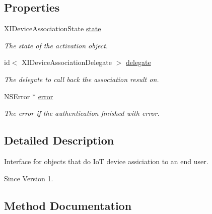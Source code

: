 \subsection*{Properties}
\begin{DoxyCompactItemize}
\item 
X\+I\+Device\+Association\+State \hyperlink{protocol_x_i_device_association_01-p_af70116567dbff00e7c465dcb9d40ae69}{state}
\begin{DoxyCompactList}\small\item\em The state of the activation object. \end{DoxyCompactList}\item 
id$<$ X\+I\+Device\+Association\+Delegate $>$ \hyperlink{protocol_x_i_device_association_01-p_a272fb3bd6bed9d86cc1fc1ba5f20912a}{delegate}
\begin{DoxyCompactList}\small\item\em The delegate to call back the association result on. \end{DoxyCompactList}\item 
N\+S\+Error $\ast$ \hyperlink{protocol_x_i_device_association_01-p_ac1c291d5cffbf45a0025fde23968dbf9}{error}
\begin{DoxyCompactList}\small\item\em The error if the authentication finished with error. \end{DoxyCompactList}\end{DoxyCompactItemize}


\subsection{Detailed Description}
Interface for objects that do IoT device assiciation to an end user. 

\begin{DoxySince}{Since}
Version 1. 
\end{DoxySince}


\subsection{Method Documentation}
\hypertarget{protocol_x_i_device_association_01-p_a51b895b55ddb9ba961d35c0bac09ef3b}{}\label{protocol_x_i_device_association_01-p_a51b895b55ddb9ba961d35c0bac09ef3b} 
